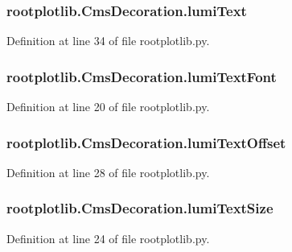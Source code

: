 \subsubsection[{lumi\-Text}]{\setlength{\rightskip}{0pt plus 5cm}rootplotlib.\-Cms\-Decoration.\-lumi\-Text}\label{classrootplotlib_1_1CmsDecoration_a2c4fa1b78057c799a0def68495a32ec1}


Definition at line 34 of file rootplotlib.\-py.

\subsubsection[{lumi\-Text\-Font}]{\setlength{\rightskip}{0pt plus 5cm}rootplotlib.\-Cms\-Decoration.\-lumi\-Text\-Font}\label{classrootplotlib_1_1CmsDecoration_a27c60712cec34727c3ae234a792736cf}


Definition at line 20 of file rootplotlib.\-py.

\subsubsection[{lumi\-Text\-Offset}]{\setlength{\rightskip}{0pt plus 5cm}rootplotlib.\-Cms\-Decoration.\-lumi\-Text\-Offset}\label{classrootplotlib_1_1CmsDecoration_a17869a82124ada178991b5fb34a38b96}


Definition at line 28 of file rootplotlib.\-py.

\subsubsection[{lumi\-Text\-Size}]{\setlength{\rightskip}{0pt plus 5cm}rootplotlib.\-Cms\-Decoration.\-lumi\-Text\-Size}\label{classrootplotlib_1_1CmsDecoration_ae25079f8ff980748c27d63cfb2bae31d}


Definition at line 24 of file rootplotlib.\-py.

